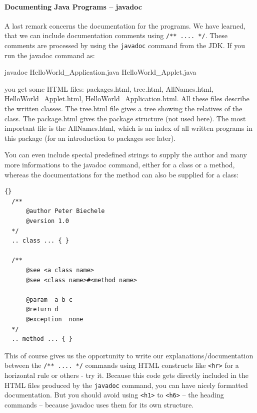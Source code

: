 \paragraph{Documenting Java Programs -- javadoc}
A last remark concerns the documentation for the programs. We have
learned, that we can include documentation comments using 
\verb|/** .... */|. These comments are processed by using the
\verb|javadoc| command from the JDK. If you run the javadoc command as: 
\begin{sverbatim}
  javadoc HelloWorld_Application.java HelloWorld_Applet.java  
\end{sverbatim}
you get some HTML files: packages.html, tree.html, AllNames.html,
HelloWorld\_Applet.html, HelloWorld\_Application.html. All these
files describe the written classes. The tree.html file gives a tree
showing the relatives of the class. The package.html gives the
package structure (not used here). The most important file is the
AllNames.html, which is an index of all written programs in this package
(for an introduction to packages see later).

You can even include special predefined strings to supply the
author and many more informations to the javadoc command, either
for a class or a method, whereas the documentations for the method
can also be supplied for a class:
\begin{lstlisting}{}
  /**
      @author Peter Biechele
      @version 1.0
  */
  .. class ... { }

  /** 
      @see <a class name>
      @see <class name>#<method name>

      @param  a b c
      @return d
      @exception  none
  */
  .. method ... { }
\end{lstlisting}

This of course gives us the opportunity to write our 
explanations/documentation
between the \verb|/** .... */| commands using HTML constructs like
\verb|<hr>| for a horizontal rule or others - try it. 
Because this code gets directly included in the HTML files produced by
the \verb|javadoc| command, you can have nicely formatted documentation.
But you should avoid using \verb|<h1>| to \verb|<h6>| -- the heading 
commands -- because javadoc uses them for its own structure.

